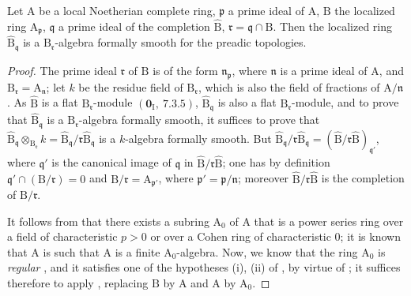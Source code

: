 \begin{theorem}[22.3.3]
\label{0.22.3.3}
Let $\mathrm{A}$ be a local Noetherian complete ring, $\mathfrak{p}$ a prime ideal of $\mathrm{A}$, $\mathrm{B}$ the localized ring $\mathrm{A}_\mathfrak{p}$, $\mathfrak{q}$ a prime ideal of the completion $\widehat{\mathrm{B}}$, $\mathfrak{r}=\mathfrak{q}\cap\mathrm{B}$.
Then the localized ring $\widehat{\mathrm{B}}_\mathfrak{q}$ is a $\mathrm{B}_\mathfrak{r}$-algebra formally smooth for the preadic topologies.
\end{theorem}

\begin{proof}
The prime ideal $\mathfrak{r}$ of $\mathrm{B}$ is of the form $\mathfrak{n}_\mathfrak{p}$, where $\mathfrak{n}$ is a prime ideal of $\mathrm{A}$, and $\mathrm{B}_\mathfrak{r}=\mathrm{A}_\mathfrak{n}$; let $k$ be the residue field of $\mathrm{B}_\mathfrak{r}$, which is also the field of fractions of $\mathrm{A}/\mathfrak{n}$.
As $\widehat{\mathrm{B}}$ is a flat $\mathrm{B}_\mathfrak{r}$-module $(\mathbf{0}_\mathrm{I},~7.3.5)$, $\widehat{\mathrm{B}}_\mathfrak{q}$ is also a flat $\mathrm{B}_\mathfrak{r}$-module, and to prove that $\widehat{\mathrm{B}}_\mathfrak{q}$ is a $\mathrm{B}_\mathfrak{r}$-algebra formally smooth, it suffices to prove that $\widehat{\mathrm{B}}_\mathfrak{q}\otimes_{\mathrm{B}_\mathfrak{r}}k=\widehat{\mathrm{B}}_\mathfrak{q}/\mathfrak{r}\widehat{\mathrm{B}}_\mathfrak{q}$ is a $k$-algebra formally smooth.
But $\widehat{\mathrm{B}}_\mathfrak{q}/\mathfrak{r}\widehat{\mathrm{B}}_\mathfrak{q}=(\widehat{\mathrm{B}}/\mathfrak{r}\widehat{\mathrm{B}})_{\mathfrak{q}'}$, where $\mathfrak{q}'$ is the canonical image of $\mathfrak{q}$ in $\widehat{\mathrm{B}}/\mathfrak{r}\widehat{\mathrm{B}}$; one has by definition $\mathfrak{q}'\cap(\mathrm{B}/\mathfrak{r})=0$ and $\mathrm{B}/\mathfrak{r}=\mathrm{A}_{\mathfrak{p}'}$, where $\mathfrak{p}'=\mathfrak{p}/\mathfrak{n}$; moreover $\widehat{\mathrm{B}}/\mathfrak{r}\widehat{\mathrm{B}}$ is the completion of $\mathrm{B}/\mathfrak{r}$.

It follows from  that there exists a subring $\mathrm{A}_0$ of $\mathrm{A}$ that is a power series ring over a field of characteristic $p>0$ or over a Cohen ring of characteristic $0$; it is known that $\mathrm{A}$ is such that $\mathrm{A}$ is a finite $\mathrm{A}_0$-algebra.
Now, we know that the ring $\mathrm{A}_0$ is \emph{regular} , and it satisfies one of the hypotheses (i), (ii) of , by virtue of ; it suffices therefore to apply , replacing $\mathrm{B}$ by $\mathrm{A}$ and $\mathrm{A}$ by $\mathrm{A}_0$.
\end{proof}

